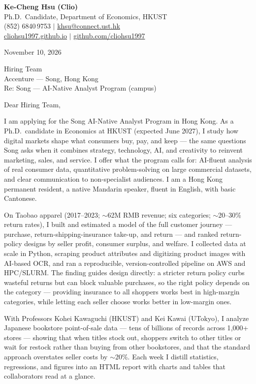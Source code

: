 \documentclass[11pt,letterpaper]{article}
\begin{document}
\noindent
{\bfseries Ke-Cheng Hsu (Clio)}\\
Ph.D.\ Candidate, Department of Economics, HKUST\\
(852) 6840\,9753 \quad $|$ \quad \href{mailto:khsu@connect.ust.hk}{khsu@connect.ust.hk}\\
\href{https://cliohsu1997.github.io/}{cliohsu1997.github.io} \quad $|$ \quad \href{https://github.com/cliohsu1997}{github.com/cliohsu1997}

\vspace{0.7em}
\noindent
November 10, 2026

\vspace{0.35em}
\noindent
Hiring Team\\
Accenture --- Song, Hong Kong\\
Re: Song --- AI-Native Analyst Program (campus)

\vspace{0.2em}
Dear Hiring Team,

I am applying for the Song AI-Native Analyst Program in Hong Kong. As a Ph.D.\ candidate in Economics at HKUST (expected June 2027), I study how digital markets shape what consumers buy, pay, and keep --- the same questions Song asks when it combines strategy, technology, AI, and creativity to reinvent marketing, sales, and service. I offer what the program calls for: AI-fluent analysis of real consumer data, quantitative problem-solving on large commercial datasets, and clear communication to non-specialist audiences. I am a Hong Kong permanent resident, a native Mandarin speaker, fluent in English, with basic Cantonese.

On Taobao apparel (2017--2023; $\sim$62M RMB revenue; six categories; $\sim$20--30\% return rates), I built and estimated a model of the full customer journey --- purchase, return-shipping-insurance take-up, and return --- and ranked return-policy designs by seller profit, consumer surplus, and welfare. I collected data at scale in Python, scraping product attributes and digitizing product images with AI-based OCR, and ran a reproducible, version-controlled pipeline on AWS and HPC/SLURM. The finding guides design directly: a stricter return policy curbs wasteful returns but can block valuable purchases, so the right policy depends on the category --- providing insurance to all shoppers works best in high-margin categories, while letting each seller choose works better in low-margin ones.

With Professors Kohei Kawaguchi (HKUST) and Kei Kawai (UTokyo), I analyze Japanese bookstore point-of-sale data --- tens of billions of records across 1{,}000+ stores --- showing that when titles stock out, shoppers switch to other titles or wait for restock rather than buying from other bookstores, and that the standard approach overstates seller costs by $\sim$20\%. Each week I distill statistics, regressions, and figures into an HTML report with charts and tables that collaborators read at a glance.
\end{document}
